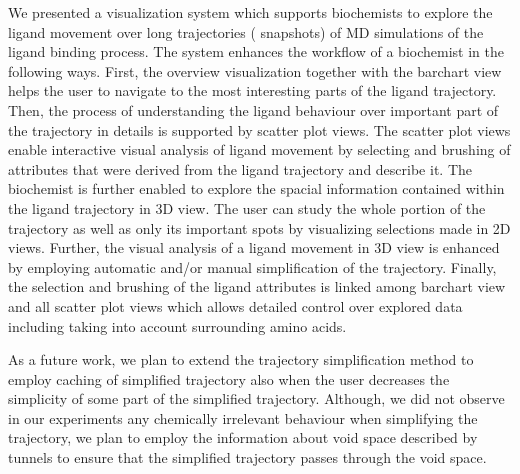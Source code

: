 We presented a visualization system which supports biochemists to explore the ligand movement over long trajectories ( snapshots) of MD simulations of the ligand binding process.
The system enhances the workflow of a biochemist in the following ways.
First, the overview visualization together with the barchart view helps the user to navigate to the most interesting parts of
the ligand trajectory.
Then, the process of understanding the ligand behaviour over important part of the trajectory in details is supported by scatter plot views.
The scatter plot views enable interactive visual analysis of ligand movement by selecting and brushing of attributes that were derived from the ligand trajectory and describe it.
The biochemist is further enabled to explore the spacial information contained within the ligand trajectory in 3D view.
The user can study the whole portion of the trajectory as well as only its important spots by visualizing selections made in 2D views.
Further, the visual analysis of a ligand movement in 3D view is enhanced by employing automatic and/or manual simplification of the trajectory.
Finally, the selection and brushing of the ligand attributes is linked among barchart view and all scatter plot views which allows detailed control over explored data including taking into account surrounding amino acids.

As a future work, we plan to extend the trajectory simplification method to employ caching of simplified trajectory also when the user decreases the simplicity of some part of the simplified trajectory.
Although, we did not observe in our experiments any chemically irrelevant behaviour when simplifying the trajectory, we plan to employ the information about void space described by tunnels to ensure that the simplified trajectory passes through the void space.